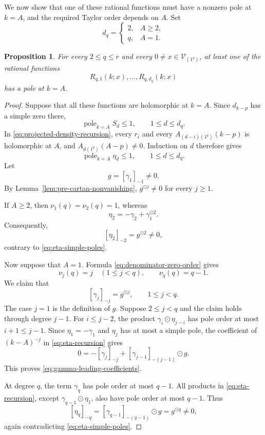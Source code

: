 \documentclass[11pt,reqno]{amsart}
\theoremstyle{corollary}
\theoremstyle{conjecture}
\theoremstyle{assumption}
\theoremstyle{proposition}
\newtheorem{proposition}[theorem]{Proposition}
\theoremstyle{remark}
\numberwithin{equation}{section}
\begin{document}
We now show that one of these rational functions must have a nonzero pole at $k=A$, and the required Taylor order depends on $A$. Set
\begin{equation}\label{eq:obstruction-orders}
d_q=
\begin{cases}
2,& A\geq 2,\\
q,& A=1.
\end{cases}
\end{equation}

\begin{proposition}\label{prop:nonzero-density-pole}
For every $2\leq q\leq r$ and every $0\neq x\in\mathcal V_{(1^q)}$, at least one of the rational functions
\[
R_{q,1}(k;x),\ldots,R_{q,d_q}(k;x)
\]
has a pole at $k=A$.
\end{proposition}

\begin{proof}
Suppose that all these functions are holomorphic at $k=A$. Since $d_{k-p}$ has a simple zero there,
\[
\operatorname{pole}_{k=A}S_d\leq 1,
\qquad 1\leq d\leq d_q.
\]
In \eqref{eq:projected-density-recursion}, every $r_i$ and every $A_{(d-i)(1^q)}(k-p)$ is holomorphic at $A$, and $A_{d(1^q)}(A-p)\neq 0$.
Induction on $d$ therefore gives
\begin{equation}\label{eq:eta-simple-poles}
\operatorname{pole}_{k=A}\eta_d\leq1,
\qquad 1\leq d\leq d_q.
\end{equation}
Let
\[
g=[\gamma_1]_{-1}\neq 0.
\]
By Lemma~\ref{lem:pre-cartan-nonvanishing},
$g^{\odot j}\neq 0$ for every $j\geq 1$.

If $A\geq 2$, then $\nu_1(q)=\nu_2(q)=1$, whereas
\[
\eta_2=-\gamma_2+\gamma_1^{\odot2}.
\]
Consequently,
\[
[\eta_2]_{-2}=g^{\odot2}\neq 0,
\]
contrary to \eqref{eq:eta-simple-poles}.

Now suppose that $A=1$. Formula \eqref{eq:denominator-zero-order} gives
\[
\nu_j(q)=j\quad(1\leq j<q),\qquad \nu_q(q)=q-1.
\]
We claim that
\begin{equation}\label{eq:gamma-leading-coefficients}
[\gamma_j]_{-j}=g^{\odot j},\qquad 1\leq j<q.
\end{equation}
The case $j=1$ is the definition of $g$. Suppose $2\leq j<q$ and the claim holds through degree $j-1$. For $i\leq j-2$, the product $\gamma_i\odot\eta_{j-i}$ has pole order at most $i+1\leq j-1$. Since $\eta_1=-\gamma_1$ and $\eta_j$ has at most a simple pole, the coefficient of $(k-A)^{-j}$ in \eqref{eq:eta-recursion} gives
\[
0=-[\gamma_j]_{-j}+[\gamma_{j-1}]_{-(j-1)}\odot g.
\]
This proves \eqref{eq:gamma-leading-coefficients}.

At degree $q$, the term $\gamma_q$ has pole order at most $q-1$. All products in \eqref{eq:eta-recursion}, except $\gamma_{q-1}\odot\eta_1$, also have pole order at most $q-1$.
Thus
\[
[\eta_q]_{-q}=[\gamma_{q-1}]_{-(q-1)}\odot g=g^{\odot q}\neq 0,
\]
again contradicting \eqref{eq:eta-simple-poles}.
\end{proof}
\end{document}

